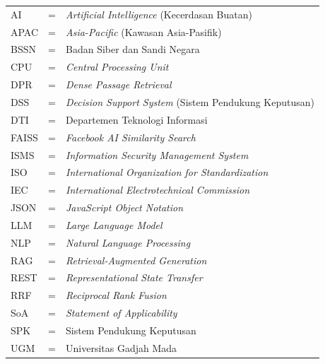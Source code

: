 \documentclass[bachelor,bahasa]{thesisdtetiugm}
\begin{document}
\begin{tabular}{llp{3.5in}}
	AI & \hspace{1.5cm} = & \textit{Artificial Intelligence} (Kecerdasan Buatan) \\
	APAC & \hspace{1.5cm} = & \textit{Asia-Pacific} (Kawasan Asia-Pasifik) \\
	BSSN & \hspace{1.5cm} = & Badan Siber dan Sandi Negara \\
	CPU & \hspace{1.5cm} = & \textit{Central Processing Unit} \\
	DPR & \hspace{1.5cm} = & \textit{Dense Passage Retrieval} \\
	DSS & \hspace{1.5cm} = & \textit{Decision Support System} (Sistem Pendukung Keputusan) \\
	DTI & \hspace{1.5cm} = & Departemen Teknologi Informasi \\
	FAISS & \hspace{1.5cm} = & \textit{Facebook AI Similarity Search} \\
	ISMS & \hspace{1.5cm} = & \textit{Information Security Management System} \\
	ISO & \hspace{1.5cm} = & \textit{International Organization for Standardization} \\
	IEC & \hspace{1.5cm} = & \textit{International Electrotechnical Commission} \\
	JSON & \hspace{1.5cm} = & \textit{JavaScript Object Notation} \\
	LLM & \hspace{1.5cm} = & \textit{Large Language Model} \\
	NLP & \hspace{1.5cm} = & \textit{Natural Language Processing} \\
	RAG & \hspace{1.5cm} = & \textit{Retrieval-Augmented Generation} \\
	REST & \hspace{1.5cm} = & \textit{Representational State Transfer} \\
	RRF & \hspace{1.5cm} = & \textit{Reciprocal Rank Fusion} \\
	SoA & \hspace{1.5cm} = & \textit{Statement of Applicability} \\
	SPK & \hspace{1.5cm} = & Sistem Pendukung Keputusan \\
	UGM & \hspace{1.5cm} = & Universitas Gadjah Mada \\
\end{tabular}
\end{document}
